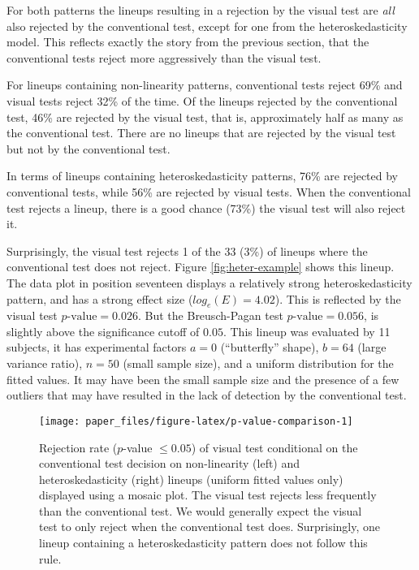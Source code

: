 \documentclass[]{interact}
\theoremstyle{plain}%
\theoremstyle{definition}
\theoremstyle{remark}
\begin{document}
For both patterns the lineups resulting in a rejection by the visual
test are \emph{all} also rejected by the conventional test, except for
one from the heteroskedasticity model. This reflects exactly the story
from the previous section, that the conventional tests reject more
aggressively than the visual test.

For lineups containing non-linearity patterns, conventional tests reject
69\% and visual tests reject 32\% of the time. Of the lineups rejected
by the conventional test, 46\% are rejected by the visual test, that is,
approximately half as many as the conventional test. There are no
lineups that are rejected by the visual test but not by the conventional
test.

In terms of lineups containing heteroskedasticity patterns, 76\% are
rejected by conventional tests, while 56\% are rejected by visual tests.
When the conventional test rejects a lineup, there is a good chance
(73\%) the visual test will also reject it.

Surprisingly, the visual test rejects 1 of the 33 (3\%) of lineups where
the conventional test does not reject. Figure \ref{fig:heter-example}
shows this lineup. The data plot in position seventeen displays a
relatively strong heteroskedasticity pattern, and has a strong effect
size (\(log_e(E)=4.02\)). This is reflected by the visual test
\(p\text{-value} = 0.026\). But the Breusch-Pagan test
\(p\text{-value} = 0.056\), is slightly above the significance cutoff of
\(0.05\). This lineup was evaluated by 11 subjects, it has experimental
factors \(a = 0\) (``butterfly'' shape), \(b = 64\) (large variance
ratio), \(n = 50\) (small sample size), and a uniform distribution for
the fitted values. It may have been the small sample size and the
presence of a few outliers that may have resulted in the lack of
detection by the conventional test.

\begin{figure}

{\centering \texttt{[image: paper\_files/figure-latex/p-value-comparison-1]} 

}

\caption{Rejection rate ($p$-value $\leq0.05$) of visual test conditional on the conventional test decision on non-linearity (left) and heteroskedasticity (right) lineups (uniform fitted values only) displayed using a mosaic plot. The visual test rejects less frequently than the conventional test. We would generally expect the visual test to only reject when the conventional test does. Surprisingly, one lineup containing a heteroskedasticity pattern does not follow this rule. }\label{fig:p-value-comparison}
\end{figure}
\end{document}
